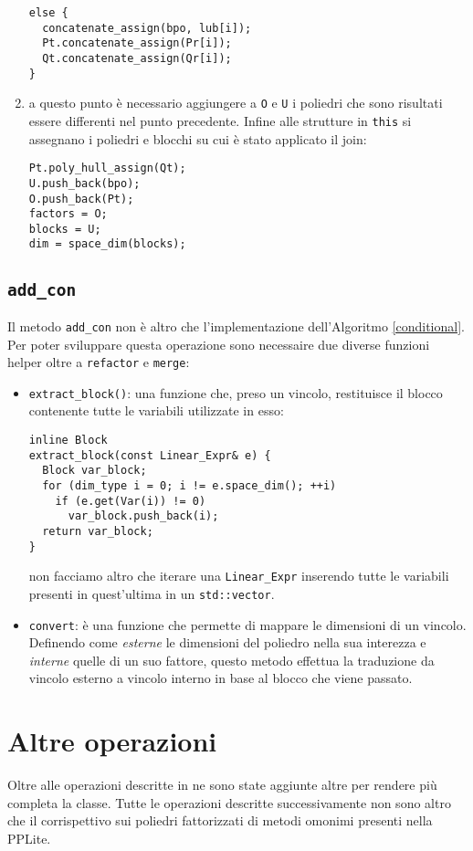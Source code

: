 \documentclass{mimosis}
\theoremstyle{definition}
\begin{document}
\begin{enumerate}
\begin{lstlisting}
else {
  concatenate_assign(bpo, lub[i]);
  Pt.concatenate_assign(Pr[i]);
  Qt.concatenate_assign(Qr[i]);
}
\end{lstlisting}
\item a questo punto è necessario aggiungere a \texttt{O} e \texttt{U} i poliedri che sono
risultati essere differenti nel punto precedente. Infine alle strutture in
\texttt{this} si assegnano i poliedri e blocchi su cui è stato applicato il join:
\lstset{style=mystyle,language=C++,label= ,caption= ,captionpos=b,numbers=none}
\begin{lstlisting}
Pt.poly_hull_assign(Qt);
U.push_back(bpo);
O.push_back(Pt);
factors = O;
blocks = U;
dim = space_dim(blocks);
\end{lstlisting}
\end{enumerate}
\subsection{\texttt{add\_con}}
\label{sec:orgb1e097b}
Il metodo \texttt{add\_con} non è altro che l'implementazione dell'Algoritmo
\ref{conditional}. Per poter sviluppare questa operazione sono necessaire due diverse
funzioni helper oltre a \texttt{refactor} e \texttt{merge}:

\begin{itemize}
\item \texttt{extract\_block()}: una funzione che, preso un vincolo, restituisce il blocco
contenente tutte le variabili utilizzate in esso:
\lstset{style=mystyle,language=C++,label= ,caption= ,captionpos=b,numbers=none}
\begin{lstlisting}
inline Block
extract_block(const Linear_Expr& e) {
  Block var_block;
  for (dim_type i = 0; i != e.space_dim(); ++i)
    if (e.get(Var(i)) != 0)
      var_block.push_back(i);
  return var_block;
}
\end{lstlisting}
non facciamo altro che iterare una \texttt{Linear\_Expr} inserendo tutte le variabili
presenti in quest'ultima in un \texttt{std::vector}.
\item \texttt{convert}: è una funzione che permette di mappare le dimensioni di un vincolo.
Definendo come \emph{esterne} le dimensioni del poliedro nella sua interezza e
\emph{interne} quelle di un suo fattore, questo metodo effettua la traduzione da
vincolo esterno a vincolo interno in base al blocco che viene passato.
\end{itemize}
\section{Altre operazioni}
\label{sec:orgd6aaa41}
Oltre alle operazioni descritte in \cite{fastpoly} ne sono state aggiunte altre
per rendere più completa la classe. Tutte le operazioni descritte
successivamente non sono altro che il corrispettivo sui poliedri fattorizzati di
metodi omonimi presenti nella PPLite.
\end{document}
